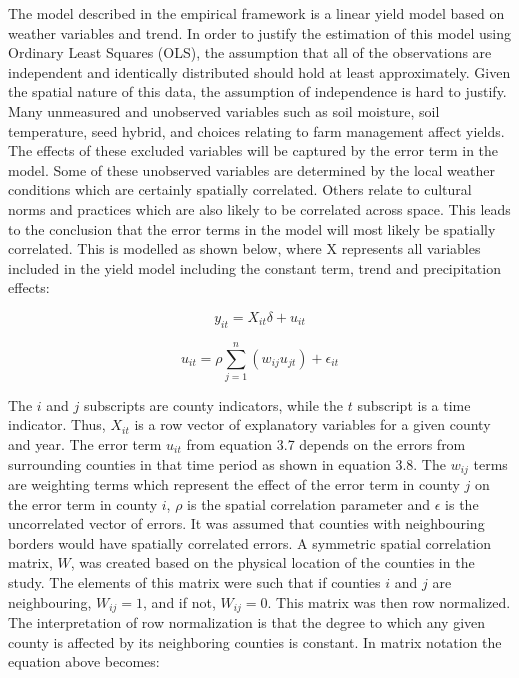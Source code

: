 The model described in the empirical framework is a linear yield model based on weather variables and trend. In order to justify the estimation of this model using Ordinary Least Squares (OLS), the assumption that all of the observations are independent and identically distributed should hold at least approximately. Given the spatial nature of this data, the assumption of independence is hard to justify. Many unmeasured and unobserved variables such as soil moisture, soil temperature, seed hybrid, and choices relating to farm management affect yields. The effects of these excluded variables will be captured by the error term in the model. Some of these unobserved variables are determined by the local weather conditions which are certainly spatially correlated. Others relate to cultural norms and practices which are also likely to be correlated across space. This leads to the conclusion that the error terms in the model will most likely be spatially correlated. This is modelled as shown below, where X represents all variables included in the yield model including the constant term, trend and  precipitation effects:

\begin{equation}
y_{it}=X_{it}\delta+u_{it}
\end{equation}

\begin{equation}
u_{it}=\rho\sum_{j=1}^{n}(w_{ij}u_{jt})+\epsilon_{it}
\end{equation}

 The $i$ and $j$ subscripts are county indicators, while the $t$ subscript is a time indicator. Thus, $X_{it}$ is a row vector of explanatory variables for a given county and year. The error term $u_{it}$ from equation 3.7 depends on the errors from surrounding counties in that time period as shown in equation 3.8. The $w_{ij}$ terms are weighting terms which represent the effect of the error term in county $j$ on the error term in county $i$, $\rho$ is the spatial correlation parameter and $\epsilon$ is the uncorrelated vector of errors. It was assumed that counties with neighbouring borders would have spatially correlated errors. A symmetric spatial correlation matrix, $W$, was created based on the physical location of the counties in the study. The elements of this matrix were such that if counties $i$ and $j$ are neighbouring, $W_{ij}=1$, and if not, $W_{ij}=0$. This matrix was then row normalized. The interpretation of row normalization is that the degree to which any given county is affected by its neighboring counties is constant. In matrix notation the equation above becomes:


